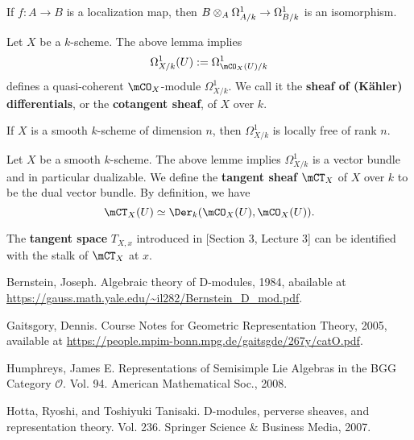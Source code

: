 	\begin{lem}
		If $f:A\to B$ is a localization map, then $B\ot_A \Omega^1_{A/k} \to \Omega^1_{B/k}$ is an isomorphism.
	\end{lem}

	\begin{constr}
		Let $X$ be a $k$-scheme. The above lemma implies 
		\[
			\Omega^1_{X/k}(U):=\Omega^1_{\mCO_X(U)/k}
		\]
		defines a quasi-coherent $\mCO_X$-module $\Omega^1_{X/k}$. We call it the \textbf{sheaf of (Kähler) differentials}, or the \textbf{cotangent sheaf}, of $X$ over $k$.
	\end{constr}

	\begin{lem}
		If $X$ is a smooth $k$-scheme of dimension $n$, then $\Omega^1_{X/k}$ is locally free of rank $n$.
	\end{lem}

	\begin{constr}
		Let $X$ be a smooth $k$-scheme. The above lemme implies $\Omega^1_{X/k}$ is a vector bundle and in particular dualizable. We define the \textbf{tangent sheaf} $\mCT_X$ of $X$ over $k$ to be the dual vector bundle. By definition, we have
		\[
			\mCT_X(U) \simeq \Der_k( \mCO_X(U), \mCO_X(U)).
		\]
	\end{constr}

	\begin{rem}
		The \textbf{tangent space} $T_{X,x}$ introduced in [Section 3, Lecture 3] can be identified with the stalk of $\mCT_X$ at $x$.
	\end{rem}

	


\begin{thebibliography}{Yau}

	 Bernstein, Joseph. Algebraic theory of D-modules, 1984, abailable at \url{https://gauss.math.yale.edu/~il282/Bernstein_D_mod.pdf}.

	 Gaitsgory, Dennis. Course Notes for Geometric Representation Theory, 2005, available at \url{https://people.mpim-bonn.mpg.de/gaitsgde/267y/catO.pdf}.

	 Humphreys, James E. Representations of Semisimple Lie Algebras in the BGG Category $\mathcal{O} $. Vol. 94. American Mathematical Soc., 2008.

	 Hotta, Ryoshi, and Toshiyuki Tanisaki. D-modules, perverse sheaves, and representation theory. Vol. 236. Springer Science \& Business Media, 2007.
\end{thebibliography}


 


